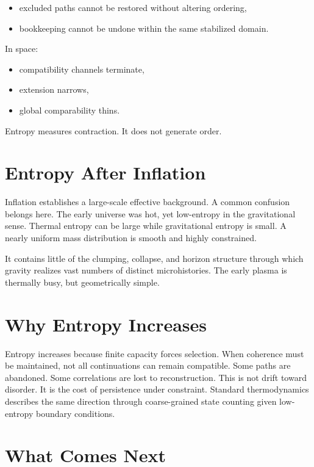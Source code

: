 \documentclass[11pt,twoside,openright]{book}
\begin{document}
\begin{itemize}
\item excluded paths cannot be restored
      without altering ordering,
\item bookkeeping cannot be undone
      within the same stabilized domain.
\end{itemize}

In space:

\begin{itemize}
\item compatibility channels terminate,
\item extension narrows,
\item global comparability thins.
\end{itemize}

Entropy measures contraction. It does not generate order.

\section*{Entropy After Inflation}

Inflation establishes a large-scale effective background. A common confusion belongs here. The early universe was hot, yet low-entropy in the gravitational sense. Thermal entropy can be large while gravitational entropy is small. A nearly uniform mass distribution is smooth and highly constrained.

It contains little of the clumping, collapse, and horizon structure through which gravity realizes vast numbers of distinct microhistories. The early plasma is thermally busy, but geometrically simple.

\section*{Why Entropy Increases}

Entropy increases because finite capacity forces selection. When coherence must be maintained, not all continuations can remain compatible. Some paths are abandoned. Some correlations are lost to reconstruction. This is not drift toward disorder. It is the cost of persistence under constraint. Standard thermodynamics describes the same direction through coarse-grained state counting given low-entropy boundary conditions.

\section*{What Comes Next}
\end{document}
